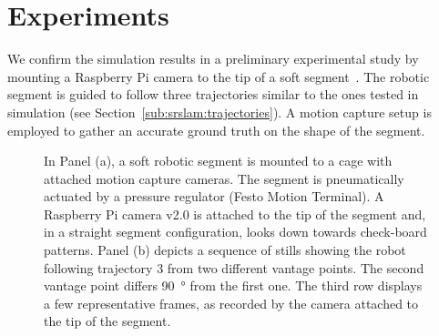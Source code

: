 \section{Experiments} \label{sec:srslam:experiments}
We confirm the simulation results in a preliminary experimental study by mounting a Raspberry Pi camera to the tip of a soft segment~\citep{katzschmann2019dynamic}. The robotic segment is guided to follow three trajectories similar to the ones tested in simulation (see Section~\ref{sub:srslam:trajectories}). %
A motion capture setup is employed to gather an accurate ground truth on the shape of the segment.

\begin{figure}
     \centering
     \caption{ In Panel (a), a soft robotic segment is mounted to a cage with attached motion capture cameras. The segment is pneumatically actuated by a pressure regulator (Festo Motion Terminal). A Raspberry Pi camera v2.0 is attached to the tip of the segment and, in a straight segment configuration, looks down towards check-board patterns. Panel (b) depicts a sequence of stills showing the robot following trajectory 3 from two different vantage points. The second vantage point differs \SI{90}{\degree} from the first one. The third row displays a few representative frames, as recorded by the camera attached to the tip of the segment.}
\end{figure}

